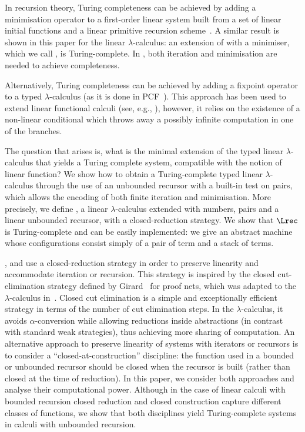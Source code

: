 \documentclass{article}
\begin{document}
In recursion theory, Turing completeness can be achieved by adding a
minimisation operator to  a first-order linear system built
from a set of linear initial functions and a linear primitive
recursion scheme~\cite{DBLP:conf/birthday/AlvesFFM07}.
A similar result is shown in this paper for the linear $\lambda$-calculus:
an extension of \LLCI with a minimiser, which we call \LLCIm, is Turing-complete.
In \LLCIm,  both iteration and minimisation are needed to achieve completeness.

Alternatively, Turing completeness can be achieved by adding a
fixpoint operator to a typed $\lambda$-calculus (as it is done in
PCF~\cite{Plotkin77}). This approach has been used to extend linear
functional calculi (see, e.g.,
\cite{MackieIC:lilfpl,PittsAM:opeplp,paolini08ppdp,Brauner94}),
however, it relies on the existence of a non-linear conditional which
throws away a possibly infinite computation in one of the branches.

The question that arises is, what is the minimal extension of the
typed linear $\lambda$-calculus that yields a Turing complete system,
compatible with the notion of linear function?  We show how to obtain
a Turing-complete typed linear $\lambda$-calculus through the use of
an unbounded recursor with a built-in test on pairs, which allows the
encoding of both finite iteration and minimisation. More precisely, we
define \LLCIrec, a linear $\lambda$-calculus extended with numbers,
pairs and a linear unbounded recursor, with a closed-reduction
strategy. We show that $\Lrec$ is Turing-complete and can be easily
implemented: we give an abstract machine whose configurations consist 
simply of a pair of term and a stack of terms. 

\LLCI, \LLCIrec and \LLCIm use a closed-reduction strategy in order to
preserve linearity and accommodate iteration or recursion. This
strategy is inspired by the closed cut-elimination strategy defined by
Girard~\cite{GirardGOI} for proof nets, which was adapted to the
$\lambda$-calculus in~\cite{fernandezM:clores}.  Closed cut
elimination is a simple and exceptionally efficient strategy in terms
of the number of cut elimination steps.  In the $\lambda$-calculus, it
avoids $\alpha$-conversion while allowing reductions inside
abstractions (in contrast with standard weak strategies), thus
achieving more sharing of computation.  An alternative approach to
preserve linearity of systems with iterators or recursors is to
consider a ``closed-at-construction'' discipline: the function used in
a bounded or unbounded recursor should be closed when the recursor is
built (rather than closed at the time of reduction).  In this paper,
we consider both approaches and analyse their computational
power. Although in the case of linear calculi with bounded recursion
closed reduction and closed construction capture different classes of
functions, we show that both disciplines yield Turing-complete systems
in calculi with unbounded recursion.
\end{document}
